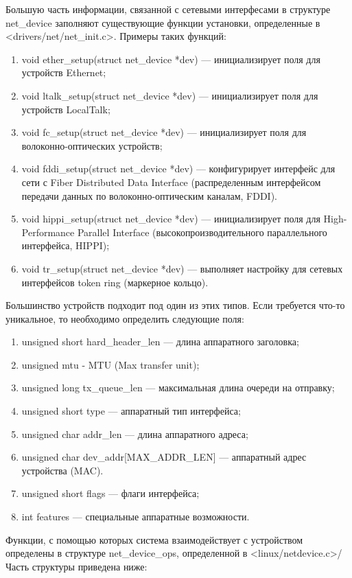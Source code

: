 \documentclass[14pt, a4paper]{extarticle}
\begin{document}
Большую часть информации, связанной с сетевыми интерфесами в структуре net\_device заполняют существующие функции установки, определенные в <drivers/net/net\_init.c>. Примеры таких функций:
\begin{enumerate}
	\item void ether\_setup(struct net\_device *dev) --- инициализирует поля для устройств Ethernet;
	\item void ltalk\_setup(struct net\_device *dev) --- инициализирует поля для устройств LocalTalk;
	\item void fc\_setup(struct net\_device *dev) --- инициализирует поля для волоконно-оптических устройств;
	\item void fddi\_setup(struct net\_device *dev) --- конфигурирует интерфейс для сети с Fiber Distributed Data Interface (распределенным интерфейсом передачи данных по волоконно-оптическим каналам, FDDI).
	\item void hippi\_setup(struct net\_device *dev) --- инициализирует поля для High-Performance Parallel Interface (высокопроизводительного параллельного интерфейса, HIPPI);
	\item void tr\_setup(struct net\_device *dev) --- выполняет настройку для сетевых интерфейсов token ring (маркерное кольцо).
\end{enumerate}
Большинство устройств подходит под один из этих типов. Если требуется что-то уникальное, то необходимо определить следующие поля:
\begin{enumerate}
	\item unsigned short hard\_header\_len --- длина аппаратного заголовка;
	\item unsigned mtu - MTU (Max transfer unit);
	\item unsigned long tx\_queue\_len --- максимальная длина очереди на отправку;
	\item unsigned short type --- аппаратный тип интерфейса;
	\item unsigned char addr\_len --- длина аппаратного адреса;
	\item unsigned char dev\_addr[MAX\_ADDR\_LEN] --- аппаратный адрес устройства (MAC).
	\item unsigned short flags --- флаги интерфейса;
	\item int features --- специальные аппаратные возможности.
\end{enumerate}
Функции, с помощью которых система взаимодействует с устройством определены в структуре net\_device\_ops, определенной в <linux/netdevice.c>/ Часть структуры приведена ниже:
\end{document}
